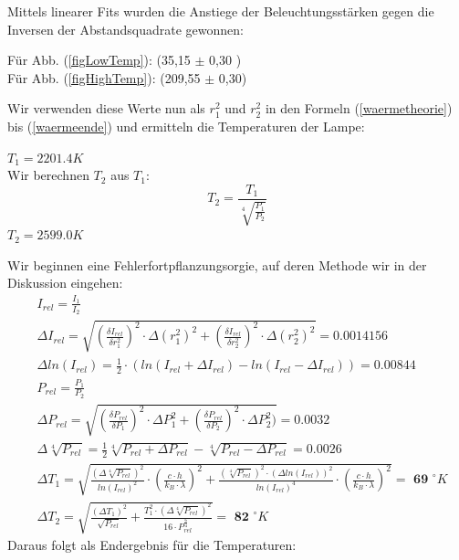 \documentclass[12pt]{article}
\begin{document}
Mittels linearer Fits wurden die Anstiege der Beleuchtungsstärken gegen die Inversen der Abstandsquadrate gewonnen:\\
\vspace{5mm}
\begin{center}
Für Abb. (\ref{figLowTemp}): \hspace{1cm}  (35,15 $\pm$ 0,30 ) \\
Für Abb. (\ref{figHighTemp}): \hspace{1cm} (209,55 $\pm$ 0,30) \\
\end{center}
\vspace{5mm}
Wir verwenden diese Werte nun als $r_1^2$ und $r_2^2$ in den Formeln (\ref{waermetheorie}) bis (\ref{waermeende}) und ermitteln die Temperaturen der Lampe: \\
\begin{center}
$T_1=2201.4 K$ \\
Wir berechnen $T_2$ aus $T_1$: \\
\begin{equation}
T_2=\frac{T_1}{\sqrt[4]{\frac{P_1}{P_2}}} 
\end{equation}
$T_2=2599.0 K$ \\
\end{center}
Wir beginnen eine Fehlerfortpflanzungsorgie, auf deren Methode wir in der Diskussion eingehen:
\begin{align*}
&I_{rel}=\frac{I_1}{I_2}\\
&\Delta I_{rel}=\sqrt{ \left(\frac{\delta I_{rel}}{\delta r_1^2}\right)^2 \cdot \Delta (r_1^2)^2 + \left(\frac{\delta I_{rel}}{\delta r_2^2}\right)^2 \cdot \Delta (r_2^2)^2 } = 0.0014156 \\
&\Delta ln (I_{rel})= \frac{1}{2} \cdot ( ln(I_{rel}+ \Delta I_{rel}) - ln ( I_{rel} - \Delta I_{rel}) ) =  0.00844\\
&P_{rel}=\frac{P_1}{P_2} \\
&\Delta P_{rel} = \sqrt{ \left(\frac{\delta P_{rel}}{\delta P_1}\right)^2 \cdot \Delta P_1^2 + \left(\frac{\delta P_{rel}}{\delta P_2}\right)^2 \cdot \Delta P_2^2)} =  0.0032 \\
&\Delta \sqrt[4]{P_{rel}} = \frac{1}{2}  \sqrt[4]{P_{rel}+ \Delta P_{rel}} -\sqrt[4]{P_{rel}-\Delta P_{rel}} = 0.0026 \\
&\Delta T_1 = \sqrt{ \frac{ (\Delta \sqrt[4]{P_{rel}})^2}{ln(I_{rel})^2} \cdot \left( \frac{c \cdot h}{k_B\cdot \lambda} \right) ^2 + \frac{ (\sqrt[4]{P_{rel}})^2 \cdot (\Delta ln(I_{rel}))^2}{ln(I_{rel})^4} \cdot \left( \frac{c \cdot h}{k_B \cdot \lambda}  \right) ^2} = \textbf{ 69 } ^{\circ} K \\
&\Delta T_2 = \sqrt{ \frac{ ( \Delta T_1)^2}{\sqrt{P_{rel}}} + \frac{T_1^2 \cdot ( \Delta \sqrt[4]{P_{rel}})^2}{16 \cdot P_{rel}^{\frac{6}{4}} } } = \textbf{ 82 } ^{\circ} K
\end{align*}
Daraus folgt als Endergebnis für die Temperaturen:
\begin{center}

\end{center}
\end{document}
